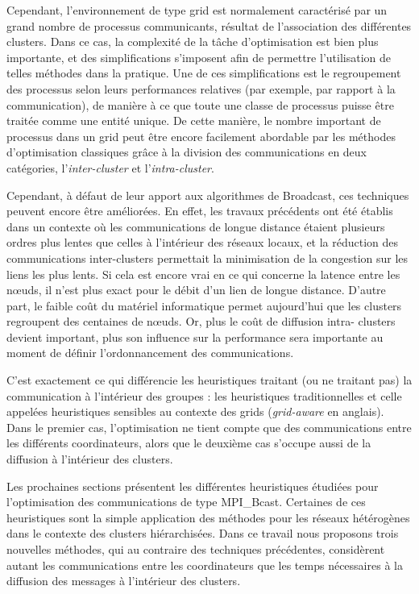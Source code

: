Cependant, l'environnement de type grid est normalement caractérisé
par un grand nombre de processus communicants, résultat de l'association
des différentes clusters. Dans ce cas, la complexité de la
tâche d'optimisation est bien plus importante, et des simplifications
s'imposent afin de permettre l'utilisation de telles méthodes dans
la pratique. Une de ces simplifications est le regroupement des processus
selon leurs performances relatives (par exemple, par rapport à la
communication), de manière à ce que toute une classe de processus
puisse être traitée comme une entité unique. De cette manière, le nombre important de processus dans un grid peut être
encore facilement abordable par les méthodes d'optimisation classiques grâce à la division des communications en deux catégories, l'\textit{inter-cluster} et l'\textit{intra-cluster}. 


Cependant, à défaut de leur apport aux algorithmes de Broadcast, ces
techniques peuvent encore être améliorées. En effet, les travaux précédents
ont été établis dans un contexte où les communications de longue distance
étaient plusieurs ordres plus lentes que celles à l'intérieur des
réseaux locaux, et la réduction des communications inter-clusters permettait
la minimisation de la congestion sur les liens les plus lents. Si
cela est encore vrai en ce qui concerne la latence entre les n{\oe}uds,
il n'est plus exact pour le débit d'un lien de longue distance. D'autre
part, le faible coût du matériel informatique permet aujourd'hui que
les  clusters regroupent des centaines de n{\oe}uds. Or, plus le coût de
diffusion \og intra- clusters \fg{} devient important, plus son influence
sur la performance sera importante au moment de définir l'ordonnancement
des communications.

C'est exactement ce qui différencie les heuristiques traitant (ou
ne traitant pas) la communication à l'intérieur des groupes : les
heuristiques \og traditionnelles \fg{} et celle appelées \og heuristiques
sensibles au contexte des grids \fg{} (\og \emph{grid-aware} \fg{}
en anglais). Dans le premier cas, l'optimisation ne tient compte que
des communications entre les différents coordinateurs, alors que le
deuxième cas s'occupe aussi de la diffusion à l'intérieur des  clusters. 


Les prochaines sections présentent les différentes heuristiques étudiées
pour l'optimisation des communications de type MPI\_Bcast. Certaines
de ces heuristiques sont la simple application des méthodes pour les
réseaux hétérogènes dans le contexte des  clusters hiérarchisées. Dans
ce travail nous proposons trois nouvelles méthodes, qui au contraire
des techniques précédentes, considèrent autant les communications
entre les coordinateurs que les temps nécessaires à la diffusion des
messages à l'intérieur des  clusters.


